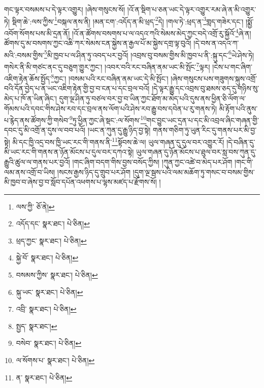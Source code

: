 གང་ལྟར་བསམས་པ་དེ་ལྟར་འགྱུར། །ཞེས་གསུངས་སོ། །འོ་ན་སྡིག་པ་ཅན་ཡང་དེ་ལྟར་འགྱུར་རམ་ཞེ་ན་མི་འགྱུར་ཏེ། སྡིག་ཆེ་:ལས་ཀྱིས་\footnote{ལས་ཀྱི་  ཅོ་ནེ། }བསྐལ་ནས་ནི། །མན་ངག་:འདོད་ན་མི་ཕྲད་\footnote{འདོད་དང་  སྣར་ཐང་།  པེ་ཅིན། }དེ། །གལ་ཏེ་:ཕྲད་ན་\footnote{ཕྲད་ཀྱང་  སྣར་ཐང་།  པེ་ཅིན། }གླད་གཟེར་དང་། །སྨྱོ་འབོག་སོགས་པས་མི་དྲན་ནོ། །འོ་ན་ཚོགས་བསགས་པ་ལ་འདའ་ཀའི་སེམས་མེད་ཀྱང་བདེ་འགྲོ་རུ་སྐྱོའོ་\footnote{སྐྱེ་བོ་  སྣར་ཐང་།  པེ་ཅིན། }ཞེ་ན། ཚོགས་དུ་མ་བསགས་ཀྱང་འཆི་ཀར་སེམས་ངན་སྐྱེས་ན་རྒྱལ་པོ་མ་སྐྱེས་དགྲ་ལྟ་བུའོ། །དེ་བས་ན་འདའ་ཀ་མའི་:བསམ་གྱིས་\footnote{བསམས་ཀྱིས་  སྣར་ཐང་།  པེ་ཅིན། }མི་ཁྱབ་པ་ལ་ཤིན་ཏུ་འབད་པར་བྱའོ། །འབྲས་བུ་བསམ་གྱིས་མི་ཁྱབ་པ་ནི་:སྐུ་དང་\footnote{སྐུ་ཡང་  སྣར་ཐང་།  པེ་ཅིན། }ཡེ་ཤེས་ཏེ། གསེར་ནི་མི་གཙང་ནང་དུ་བཅུག་གྱུར་ཀྱང་། །འབར་བའི་རང་བཞིན་ནམ་ཡང་མི་སྤོང་\footnote{འབྲི་  སྣར་ཐང་།  པེ་ཅིན། }ལྟར། །ངེས་པ་གང་ཞིག་འཇིག་རྟེན་ཆོས་སྤྱོད་\footnote{སྤྱད་  སྣར་ཐང་། }ཀྱང་། །བསམ་པའི་རང་བཞིན་ནམ་ཡང་དེ་མི་སྤོང་། །ཞེས་གསུངས་པས་གཟུགས་སྐུས་འགྲོ་བའི་དོན་བྱེད་པ་ན་ཡང་འཇིག་རྟེན་གྱི་བྱ་བ་ངན་པ་དང་བྲལ་བའོ། །དེ་ལྟར་རྒྱུ་དང་འབྲས་བུ་ཐམས་ཅད་དུ་གཉིས་སུ་མེད་པ་ཁོ་ན་ཡིན་ཞིང་། དུག་ལྔ་ཤིན་ཏུ་བཙལ་བར་བྱ་བ་ཡིན་ཀྱང་ཐོག་མ་མེད་པའི་དུས་ནས་ཕྱིན་ཅི་ལོག་ལ་གོམས་པའི་དབང་གིས་ཤེས་རབ་དང་བྲལ་ནས་ལོག་པའི་ཤེས་རབ་རྒྱུ་བས་དབེན་པ་རུ་གནས་ཏེ། མི་རྟོག་པའི་ནུས་པ་རྙེད་ནས་ཚོགས་ཀྱི་གསེབ་\footnote{བསེབ་  སྣར་ཐང་།  པེ་ཅིན། }ཏུ་ཕྱིན་ཀྱང་ཞེ་སྡང་:ལ་སོགས་\footnote{ལ་སོགས་པ་  སྣར་ཐང་།  པེ་ཅིན། }གང་བྱུང་ཡང་དྲན་པ་དང་མི་འབྲལ་ཞིང་གཞན་གྱི་དབང་དུ་མི་འགྲོ་ན་དུས་ལ་བབ་པའོ། །ཡང་ན་ཀུན་དུ་རྒྱུ་ཉིད་བྱ་སྟེ། གནས་གཅིག་ཏུ་ཡུན་རིང་དུ་གནས་པར་མི་བྱ་སྟེ། མི་དང་ཁྱི་འདྲ་བས་ཁྱི་ཡང་རང་གི་གནས་ནི་\footnote{ན་  སྣར་ཐང་།  པེ་ཅིན། }སྟོབས་ཆེ་ལ། ཡུལ་གཞན་དུ་དུལ་བར་འགྱུར་རོ། །དེ་བཞིན་དུ་མི་ཡང་རང་གི་གནས་ན་ཉོན་མོངས་པ་དུལ་བར་དཀའ་སྟེ། ཡུལ་གཞན་དུ་ཉོན་མོངས་པ་ཐུལ་བར་སླ་བས་ཀུན་དུ་རྒྱུའི་ཚུལ་ལ་གནས་པར་བྱའོ། །གང་ཞིག་བདག་གིས་བྱས་བསོད་ཀྱིས། །ཀུན་ཀྱང་འཚེ་བ་མེད་པར་ཤོག །གང་གི་ལམ་ནས་འགྲོ་བ་ཡིས། །སངས་རྒྱས་ཉིད་དུ་གྲུབ་པར་ཤོག །དུག་ལྔ་སྦས་པའི་ལམ་མཆོག་ཏུ་གསང་བ་བསམ་གྱིས་མི་ཁྱབ་བ་ཞེས་བྱ་བ་སློབ་དཔོན་འཕགས་པ་ལྷས་མཛད་པ་རྫོགས་སོ། ། 